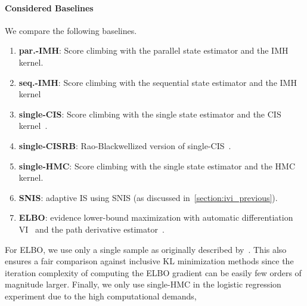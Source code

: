 \vspace{-0.1in}
\paragraph{Considered Baselines}
We compare the following baselines.
\vspace{-0.1in}
\begin{enumerate}[noitemsep]
  \item[\ding{182}] \textbf{par.-IMH}: Score climbing with the parallel state estimator and the IMH kernel. 
  \item[\ding{183}] \textbf{seq.-IMH}: Score climbing with the sequential state estimator and the IMH kernel 
  \item[\ding{184}] \textbf{single-CIS}: Score climbing with the single state estimator and the CIS kernel~\citep{NEURIPS2020_b2070693}.
  \item[\ding{185}] \textbf{single-CISRB}: Rao-Blackwellized version of single-CIS~\citep{NEURIPS2020_b2070693}.
  \item[\ding{184}] \textbf{single-HMC}: Score climbing with the single state estimator and the HMC kernel.
  \item[\ding{186}] \textbf{SNIS}: adaptive IS using SNIS (as discussed in~\cref{section:ivi_previous}).
  \item[\ding{187}] \textbf{ELBO}: evidence lower-bound maximization with automatic differentiation VI~\citep{pmlr-v33-ranganath14, JMLR:v18:16-107} and the path derivative estimator~\citep{NIPS2017_e91068ff}.
\end{enumerate}
For ELBO, we use only a single sample as originally described by~\citet{NIPS2017_e91068ff}.
This also ensures a fair comparison against inclusive KL minimization methods since the iteration complexity of computing the ELBO gradient can be easily few orders of magnitude larger.
Finally, we only use single-HMC in the logistic regression experiment due to the high computational demands, 



